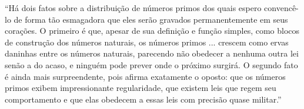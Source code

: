 ``Há dois fatos sobre a distribuição de números primos dos quais espero convencê-lo de forma tão esmagadora que eles serão gravados permanentemente em seus corações. O primeiro é que, apesar de sua definição e função simples, como blocos de construção dos números naturais, os números primos ... crescem como ervas daninhas entre os números naturais, parecendo não obedecer a nenhuma outra lei senão a do acaso, e ninguém pode prever onde o próximo surgirá. O segundo fato é ainda mais surpreendente, pois afirma exatamente o oposto: que os números primos exibem impressionante regularidade, que existem leis que regem seu comportamento e que elas obedecem a essas leis com precisão quase militar.''


